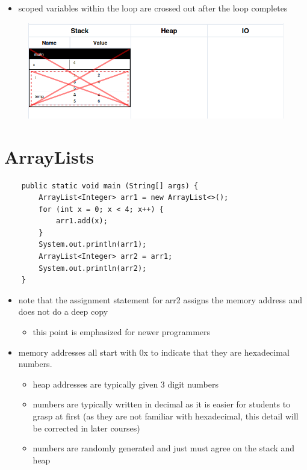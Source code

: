 \documentclass{article}
\begin{document}
\begin{itemize}
	\item scoped variables within the loop are crossed out after the loop completes
\end{itemize}

\begin{figure}[H]
	\centering
	\includegraphics{forScoped.png}
\end{figure}

\pagebreak


\section{ArrayLists}

\begin{verbatim}
	public static void main (String[] args) {
	    ArrayList<Integer> arr1 = new ArrayList<>();
	    for (int x = 0; x < 4; x++) {
	        arr1.add(x);
	    }
	    System.out.println(arr1);
	    ArrayList<Integer> arr2 = arr1;
	    System.out.println(arr2);
	}
\end{verbatim}

\begin{itemize}
	\item note that the assignment statement for arr2 assigns the memory address
	and does not do a deep copy
	\begin{itemize}
		\item this point is emphasized for newer programmers
	\end{itemize}
	\item memory addresses all start with 0x to indicate that they are
	hexadecimal numbers.
	\begin{itemize}
		\item heap addresses are typically given 3 digit numbers
		\item numbers are typically written in decimal as it is easier for
		students to grasp at first (as they are not familiar with hexadecimal,
		this detail will be corrected in later courses)
		\item numbers are randomly generated and just must agree on the stack and heap
	\end{itemize}
\end{itemize}
\end{document}

